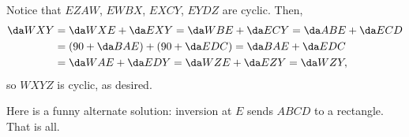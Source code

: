 Notice that $EZAW$, $EWBX$, $EXCY$, $EYDZ$ are cyclic. Then,
\begin{align*}
    \da WXY&=\da WXE+\da EXY=\da WBE+\da ECY=\da ABE+\da ECD\\
    &=(90+\da BAE)+(90+\da EDC)=\da BAE+\da EDC\\
    &=\da WAE+\da EDY=\da WZE+\da EZY=\da WZY,
\end{align*}
so $WXYZ$ is cyclic, as desired.
\begin{boxremark}
    Here is a funny alternate solution: inversion at $E$ sends $ABCD$ to a rectangle. That is all.
\end{boxremark}
